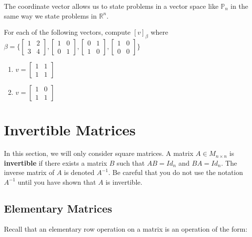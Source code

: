 The coordinate vector allows us to state problems in a vector space like $\mathbb{P}_n$ in the same way we state problems in $\mathbb{R}^n$.

\bq For each of the following vectors, compute $[v]_{\beta}$ where $\beta =\{ \begin{bmatrix} 1&2\\3&4  \end{bmatrix}, \begin{bmatrix} 1&0\\0&1  \end{bmatrix}, \begin{bmatrix} 0&1\\1&0  \end{bmatrix}, \begin{bmatrix} 1&0\\0&0 \end{bmatrix} \}$
\begin{enumerate}
\item $v=\begin{bmatrix} 1&1\\1&1  \end{bmatrix}$
\item $v=\begin{bmatrix} 1&0\\1&1  \end{bmatrix}$
\end{enumerate}
\eq


\section{Invertible Matrices}

In this section, we will only consider square matrices. A matrix $A \in M_{n \times n}$ is \textbf{invertible} if there exists a matrix $B$ such that $AB=Id_n$ and $BA=Id_n$. The inverse matrix of $A$ is denoted $A^{-1}$. Be careful that you do not use the notation $A^{-1}$ until you have shown that $A$ is invertible.

\subsection{Elementary Matrices}

Recall that an elementary row operation on a matrix is an operation of the form:

